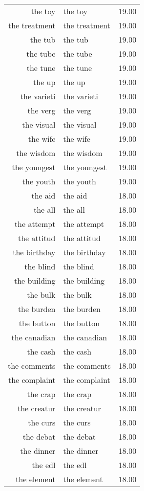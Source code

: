 \begin{table}[ht]
\begin{tabular}{rlr}
  the toy & the toy & 19.00 \\ 
  the treatment & the treatment & 19.00 \\ 
  the tub & the tub & 19.00 \\ 
  the tube & the tube & 19.00 \\ 
  the tune & the tune & 19.00 \\ 
  the up & the up & 19.00 \\ 
  the varieti & the varieti & 19.00 \\ 
  the verg & the verg & 19.00 \\ 
  the visual & the visual & 19.00 \\ 
  the wife & the wife & 19.00 \\ 
  the wisdom & the wisdom & 19.00 \\ 
  the youngest & the youngest & 19.00 \\ 
  the youth & the youth & 19.00 \\ 
  the aid & the aid & 18.00 \\ 
  the all & the all & 18.00 \\ 
  the attempt & the attempt & 18.00 \\ 
  the attitud & the attitud & 18.00 \\ 
  the birthday & the birthday & 18.00 \\ 
  the blind & the blind & 18.00 \\ 
  the building & the building & 18.00 \\ 
  the bulk & the bulk & 18.00 \\ 
  the burden & the burden & 18.00 \\ 
  the button & the button & 18.00 \\ 
  the canadian & the canadian & 18.00 \\ 
  the cash & the cash & 18.00 \\ 
  the comments & the comments & 18.00 \\ 
  the complaint & the complaint & 18.00 \\ 
  the crap & the crap & 18.00 \\ 
  the creatur & the creatur & 18.00 \\ 
  the curs & the curs & 18.00 \\ 
  the debat & the debat & 18.00 \\ 
  the dinner & the dinner & 18.00 \\ 
  the edl & the edl & 18.00 \\ 
  the element & the element & 18.00 \\ 

\end{tabular}
\end{table}
